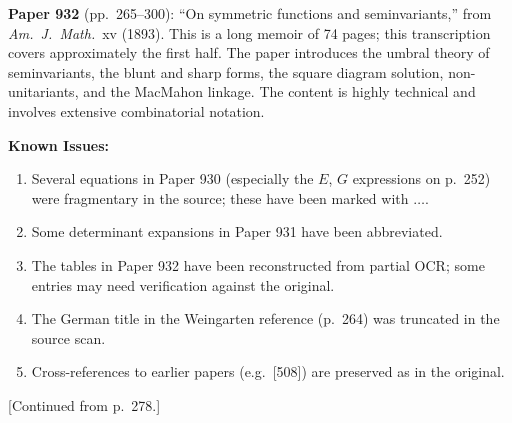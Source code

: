 \documentclass[11pt,a4paper]{book}
\begin{document}
\textbf{Paper 932} (pp.\ 265--300): ``On symmetric functions and seminvariants,''
from \textit{Am.\ J.\ Math.}\ xv (1893). This is a long memoir of 74 pages;
this transcription covers approximately the first half. The paper introduces
the umbral theory of seminvariants, the blunt and sharp forms, the square
diagram solution, non-unitariants, and the MacMahon linkage. The content is
highly technical and involves extensive combinatorial notation.

\textbf{Known Issues:}
\begin{enumerate}
\item Several equations in Paper 930 (especially the $E$, $G$ expressions on p.\ 252)
were fragmentary in the source; these have been marked with $\ldots$.
\item Some determinant expansions in Paper 931 have been abbreviated.
\item The tables in Paper 932 have been reconstructed from partial OCR; some
entries may need verification against the original.
\item The German title in the Weingarten reference (p.\ 264) was truncated in
the source scan.
\item Cross-references to earlier papers (e.g.\ [508]) are preserved as in the original.
\end{enumerate}
\clearpage


\thispagestyle{empty}
\setcounter{page}{279}

\begin{center}
[Continued from p.~278.]
\end{center}

\setcounter{art}{21}
\end{document}
